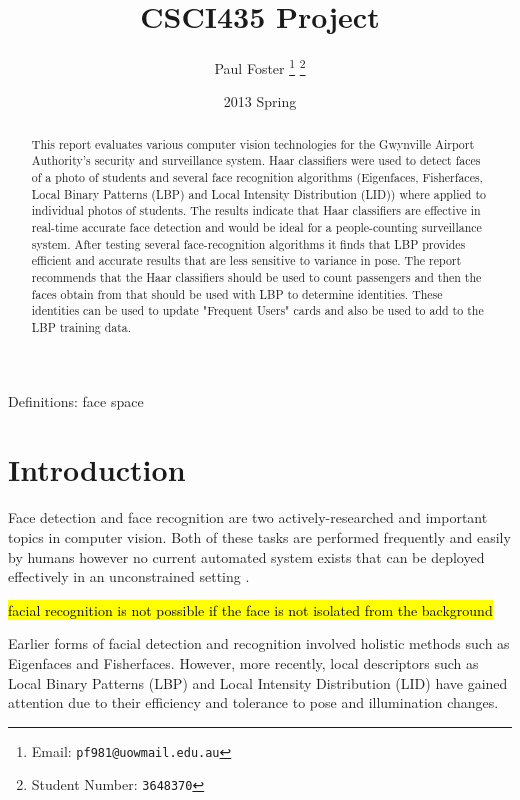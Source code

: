 \documentclass{article}
\begin{document}
\title{CSCI435 Project}
\author{Paul Foster
	\thanks{Email: \texttt{pf981@uowmail.edu.au}}
	\thanks{Student Number: \texttt{3648370}}}
\date{2013 Spring}

\maketitle

\renewcommand\abstractname{Executive Summary}
\begin{abstract}
This report evaluates various computer vision technologies for the Gwynville Airport Authority's security and surveillance system. Haar classifiers were used to detect faces of a photo of students and several face recognition algorithms (Eigenfaces, Fisherfaces, Local Binary Patterns (LBP) and Local Intensity Distribution (LID)) where applied to individual photos of students. The results indicate that Haar classifiers are effective in real-time accurate face detection and would be ideal for a people-counting surveillance system. After testing several face-recognition algorithms it finds that LBP provides efficient and accurate results that are less sensitive to variance in pose. The report recommends that the Haar classifiers should be used to count passengers and then the faces obtain from that should be used with LBP to determine identities. These identities can be used to update "Frequent Users" cards and also be used to add to the LBP training data.
\end{abstract}

Definitions: face space

\section{Introduction}
Face detection and face recognition are two actively-researched and important topics in computer vision. Both of these tasks are performed frequently and easily by humans however no current automated system exists that can be deployed effectively in an unconstrained setting \cite{sinha2006face}.

\hl{facial recognition is not possible if the face is not isolated from the background}\cite{wilson2006facial}

Earlier forms of facial detection and recognition involved holistic methods such as Eigenfaces\cite{turk1991eigenfaces} and Fisherfaces\cite{belhumeur1997eigenfaces}. However, more recently, local descriptors such as Local Binary Patterns (LBP)\cite{ahonen2004face} and Local Intensity Distribution (LID)\cite{nguyen2011local} have gained attention due to their efficiency and tolerance to pose and illumination changes.
\end{document}
